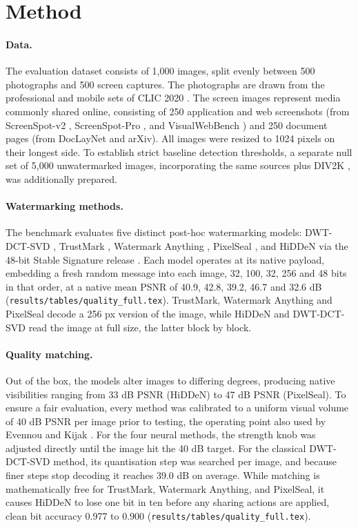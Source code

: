 \documentclass[10pt,twocolumn]{article}
\newcommand{\rf}[1]{\texttt{\small #1}}
\begin{document}
\section{Method}

\paragraph{Data.}
The evaluation dataset consists of 1,000 images, split evenly between 500 photographs and 500 screen captures.  The photographs are drawn from the professional and mobile sets of CLIC 2020 \cite{clic2020}. The screen images represent media commonly shared online, consisting of 250 application and web screenshots (from ScreenSpot-v2 \cite{wu2024osatlas}, ScreenSpot-Pro \cite{li2025screenspotpro}, and VisualWebBench \cite{liu2024visualwebbench}) and 250 document pages (from DocLayNet \cite{pfitzmann2022doclaynet} and arXiv). All images were resized to 1024 pixels on their longest side. To establish strict baseline detection thresholds, a separate null set of 5,000 unwatermarked images,  incorporating the same sources plus DIV2K \cite{agustsson2017div2k}, was additionally prepared. 

\paragraph{Watermarking methods.}
The benchmark evaluates five distinct post-hoc watermarking models: DWT-DCT-SVD \cite{invisiblewatermark}, TrustMark \cite{bui2023trustmark}, Watermark Anything \cite{sander2024wam}, PixelSeal \cite{fernandez2024videoseal, pixelseal2025}, and HiDDeN \cite{zhu2018hidden} via the 48-bit Stable Signature release \cite{fernandez2023stablesignature}.  Each model operates at its native payload, embedding a fresh random message into each image, 32, 100, 32, 256 and 48 bits in that order, at a native mean PSNR of 40.9, 42.8, 39.2, 46.7 and 32.6 dB (\rf{results/tables/quality\_full.tex}). TrustMark, Watermark Anything and PixelSeal decode a 256 px version of the image, while HiDDeN and DWT-DCT-SVD read the image at full size, the latter block by block.

\paragraph{Quality matching.}
Out of the box, the models alter images to differing degrees, producing native visibilities ranging from 33 dB PSNR (HiDDeN) to 47 dB PSNR (PixelSeal). To ensure a fair evaluation, every method was calibrated to a uniform visual volume of 40 dB PSNR per image prior to testing, the operating point also used by Evennou and Kijak \cite{evennou2026forensic}. For the four neural methods, the strength knob was adjusted directly until the image hit the 40 dB target. For the classical DWT-DCT-SVD method, its quantisation step was searched per image, and because finer steps stop decoding it reaches 39.0 dB on average. While matching is mathematically free for TrustMark, Watermark Anything, and PixelSeal, it causes HiDDeN to lose one bit in ten before any sharing actions are applied, clean bit accuracy 0.977 to 0.900 (\rf{results/tables/quality\_full.tex}).
\end{document}
